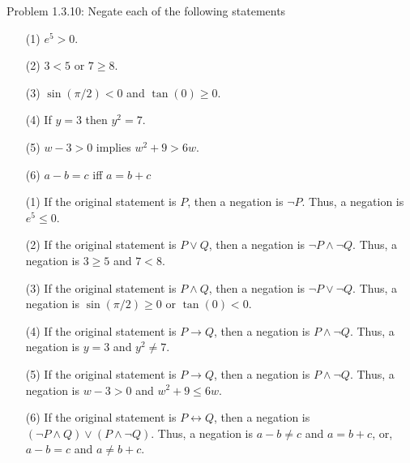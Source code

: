 \documentclass{article}
\theoremstyle{definition}
\begin{document}
	\vspace{.5cm}


	\noindent Problem 1.3.10: Negate each of the following statements
	\begin{itemize}
		\item[(1)] $e^5>0.$
		\item[(2)] $3<5$ or $7\ge 8.$
		\item[(3)] $\sin(\pi/2)<0$ and $\tan(0)\ge 0.$
		\item[(4)] If $y=3$ then $y^2=7.$
		\item[(5)] $w-3>0$ implies $w^2+9>6w.$
		\item[(6)] $a-b=c$ iff $a=b+c$
	\end{itemize}

	\vspace{0.25cm}
	\begin{itemize}
		\item[(1)] If the original statement is $P$, then a negation is $\neg P$. Thus, a negation is $e^5\le 0$.
		\item[(2)]  If the original statement is $P \vee Q$, then a negation is $\neg P \wedge \neg Q$. Thus, a negation is $3 \ge 5$ and $7 < 8$.
		\item[(3)]  If the original statement is $P \wedge Q$, then a negation is $\neg P \vee \neg Q$. Thus, a negation is $\sin(\pi/2) \ge 0$ or $\tan(0) < 0$.
		\item[(4)]  If the original statement is $P \rightarrow Q$, then a negation is $P \wedge \neg Q$. Thus, a negation is $y=3$ and $y^2 \ne 7$.
		\item[(5)]  If the original statement is $P \rightarrow Q$, then a negation is $P \wedge \neg Q$. Thus, a negation is $w - 3 > 0$ and $w^2 + 9 \le 6w$.
		\item[(6)]  If the original statement is $P \leftrightarrow Q$, then a negation is $(\neg P \wedge Q) \vee (P \wedge \neg Q)$. Thus, a negation is $a - b \ne c$ and $a = b + c$, or, $a - b = c$ and $a \ne b + c$.
	\end{itemize}

	\vspace{.5cm}
\end{document}
